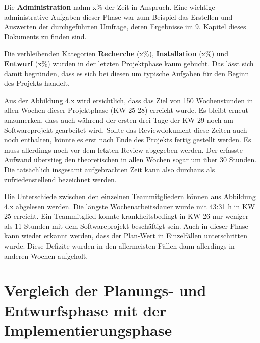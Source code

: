 \documentclass[../review_3.tex]{subfiles}
\begin{document}
Die \textbf{Administration} nahm x\% der Zeit in Anspruch. Eine wichtige administrative Aufgaben dieser Phase war zum Beispiel das Erstellen und Auswerten der durchgeführten Umfrage, deren Ergebnisse im 9. Kapitel dieses Dokuments zu finden sind.

Die verbleibenden Kategorien \textbf{Recherche} (x\%), \textbf{Installation} (x\%) und \textbf{Entwurf} (x\%) wurden in der letzten Projektphase kaum gebucht. Das lässt sich damit begründen, dass es sich bei diesen um typische Aufgaben für den Beginn des Projekts handelt.


Aus der Abbildung 4.x wird ersichtlich, dass das Ziel von 150 Wochenstunden in allen Wochen dieser Projektphase (KW 25-28) erreicht wurde. Es bleibt erneut anzumerken, dass auch während der ersten drei Tage der KW 29 noch am Softwareprojekt gearbeitet wird. Sollte das Reviewdokument diese Zeiten auch noch enthalten, könnte es erst nach Ende des Projekts fertig gestellt werden. Es muss allerdings noch vor dem letzten Review abgegeben werden. Der erfasste Aufwand überstieg den theoretischen in allen Wochen sogar um über 30 Stunden. Die tatsächlich insgesamt aufgebrachten Zeit kann also durchaus als zufriedenstellend bezeichnet werden.


Die Unterschiede zwischen den einzelnen Teammitgliedern können aus Abbildung 4.x abgelesen werden. Die längste Wochenarbeitsdauer wurde mit 43:31 h in KW 25 erreicht. Ein Teammitglied konnte krankheitsbedingt in KW 26 nur weniger als 11 Stunden mit dem Softwareprojekt beschäftigt sein. Auch in dieser Phase kann wieder erkannt werden, dass der Plan-Wert in Einzelfällen unterschritten wurde. Diese Defizite wurden in den allermeisten Fällen dann allerdings in anderen Wochen aufgeholt.

\section{Vergleich der Planungs- und Entwurfsphase mit der Implementierungsphase}
\end{document}
